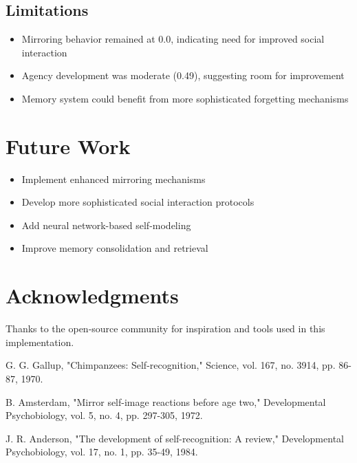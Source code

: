 \documentclass[conference]{IEEEtran}
\begin{document}
\subsection{Limitations}
\begin{itemize}
    \item Mirroring behavior remained at 0.0, indicating need for improved social interaction
    \item Agency development was moderate (0.49), suggesting room for improvement
    \item Memory system could benefit from more sophisticated forgetting mechanisms
\end{itemize}

\section{Future Work}
\begin{itemize}
    \item Implement enhanced mirroring mechanisms
    \item Develop more sophisticated social interaction protocols
    \item Add neural network-based self-modeling
    \item Improve memory consolidation and retrieval
\end{itemize}

\section*{Acknowledgments}
Thanks to the open-source community for inspiration and tools used in this implementation.


\begin{thebibliography}{1}
G. G. Gallup, "Chimpanzees: Self-recognition," Science, vol. 167, no. 3914, pp. 86-87, 1970.

B. Amsterdam, "Mirror self-image reactions before age two," Developmental Psychobiology, vol. 5, no. 4, pp. 297-305, 1972.

J. R. Anderson, "The development of self-recognition: A review," Developmental Psychobiology, vol. 17, no. 1, pp. 35-49, 1984.
\end{thebibliography}
\end{document}
